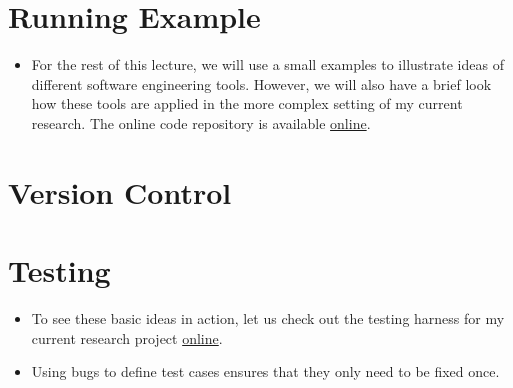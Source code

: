 \section{Running Example}
\begin{itemize}
\item For the rest of this lecture, we will use a small examples to illustrate ideas of different software engineering tools. However, we will also have a brief look how these tools are applied in the more complex setting of my current research. The online code repository is available \href{https://github.com/robustToolbox/package}{online}.
\end{itemize}

\section{Version Control}

\nocite{Bilschak.2016}

\section{Testing}
\begin{itemize}
\item To see these basic ideas in action, let us check out the testing harness for my current research project \href{https://github.com/robustToolbox/package/tree/master/development/tests}{online}.
\item Using bugs to define test cases ensures that they only need to be fixed once.
\end{itemize}


